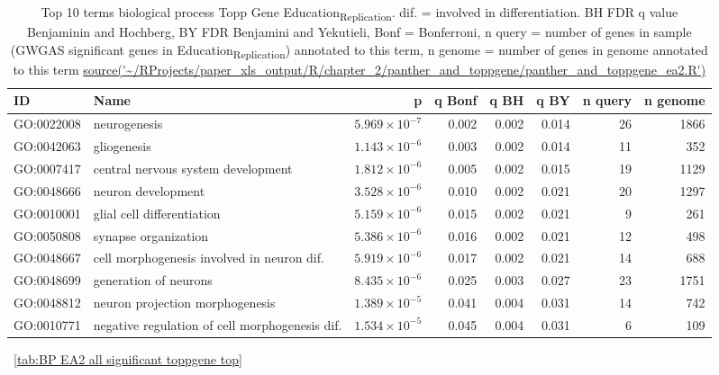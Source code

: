 \begin{table}[ht]
\centering
\begin{adjustbox}{width=\textwidth}

\begin{tabular}{llrrrrrr}
  \hline
ID & Name & p & q Bonf & q BH & q BY & n query & n genome \\ 
  \hline
GO:0022008 & neurogenesis & $5.969 \times 10^{-7}$ & 0.002 & 0.002 & 0.014 & 26 & 1866 \\ 
  GO:0042063 & gliogenesis & $1.143 \times 10^{-6}$ & 0.003 & 0.002 & 0.014 & 11 & 352 \\ 
  GO:0007417 & central nervous system development & $1.812 \times 10^{-6}$ & 0.005 & 0.002 & 0.015 & 19 & 1129 \\ 
  GO:0048666 & neuron development & $3.528 \times 10^{-6}$ & 0.010 & 0.002 & 0.021 & 20 & 1297 \\ 
  GO:0010001 & glial cell differentiation & $5.159 \times 10^{-6}$ & 0.015 & 0.002 & 0.021 & 9 & 261 \\ 
  GO:0050808 & synapse organization & $5.386 \times 10^{-6}$ & 0.016 & 0.002 & 0.021 & 12 & 498 \\ 
  GO:0048667 & cell morphogenesis involved in neuron dif. & $5.919 \times 10^{-6}$ & 0.017 & 0.002 & 0.021 & 14 & 688 \\ 
  GO:0048699 & generation of neurons & $8.435 \times 10^{-6}$ & 0.025 & 0.003 & 0.027 & 23 & 1751 \\ 
  GO:0048812 & neuron projection morphogenesis & $1.389 \times 10^{-5}$ & 0.041 & 0.004 & 0.031 & 14 & 742 \\ 
  GO:0010771 & negative regulation of cell morphogenesis  dif. & $1.534 \times 10^{-5}$ & 0.045 & 0.004 & 0.031 & 6 & 109 \\ 
   \hline
\end{tabular}
\end{adjustbox}
\caption{Top 10 terms biological process Topp Gene Education\textsubscript{Replication}. dif. = involved in differentiation. BH FDR q value Benjaminin and Hochberg, BY FDR Benjamini and Yekutieli, Bonf = Bonferroni, n query = number of genes in sample (GWGAS significant genes in Education\textsubscript{Replication}) annotated to this term, n genome = number of genes in genome annotated to this term \url{source('~/RProjects/paper_xls_output/R/chapter_2/panther_and_toppgene/panther_and_toppgene_ea2.R')}}
~\ref{tab:BP EA2 all significant toppgene top}
\end{table}




